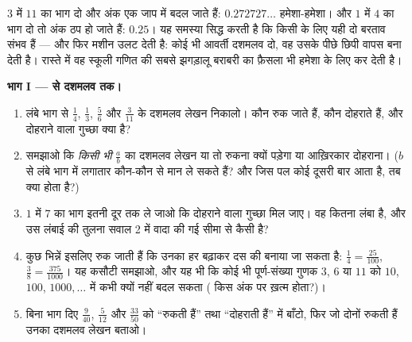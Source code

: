 \begin{problem}
\label{pb:g9:fractions:1}
$3$ में $11$ का भाग दो और अंक एक जाप में बदल जाते हैं:
$0.272727\ldots$ हमेशा-हमेशा। और $1$ में $4$ का भाग दो तो अंक ठप
हो जाते हैं: $0.25$। यह समस्या सिद्ध करती है कि किसी  के लिए
यही दो बरताव संभव हैं --- और फिर मशीन उलट देती है: कोई भी आवर्ती
दशमलव दो, वह उसके पीछे छिपी  वापस बना देती है। रास्ते में वह
स्कूली गणित की सबसे झगड़ालू बराबरी का फ़ैसला भी हमेशा के लिए कर देती
है।

\medskip
\noindent\textbf{भाग I ---  से दशमलव तक।}
\begin{enumerate}
  \item लंबे भाग से $\frac14$, $\frac13$, $\frac56$ और
        $\frac{3}{11}$ के दशमलव लेखन निकालो। कौन रुक जाते हैं,
        कौन दोहराते हैं, और दोहराने वाला गुच्छा क्या है?
  \item समझाओ कि \emph{किसी भी}  $\frac ab$ का दशमलव लेखन या
        तो रुकना क्यों पड़ेगा या आख़िरकार दोहराना। ($b$ से लंबे भाग
        में लगातार  कौन-कौन से मान ले सकते हैं? और जिस पल कोई
         दूसरी बार आता है, तब क्या होता है?)
  \item $1$ में $7$ का भाग इतनी दूर तक ले जाओ कि दोहराने वाला
        गुच्छा मिल जाए। वह कितना लंबा है, और उस लंबाई की तुलना
        सवाल 2 में वादा की गई सीमा से कैसी है?
  \item कुछ भिन्नें इसलिए रुक जाती हैं कि उनका हर बढ़ाकर दस की 
        बनाया जा सकता है: $\frac14 = \frac{25}{100}$,
        $\frac{3}{8} = \frac{375}{1000}$। यह कसौटी समझाओ, और यह भी
        कि कोई भी पूर्ण-संख्या गुणक $3$, $6$ या $11$ को $10$,
        $100$, $1000, \dots$ में कभी क्यों नहीं बदल सकता (
        किस अंक पर ख़त्म होता?)।
  \item बिना भाग दिए $\frac{9}{40}$, $\frac{5}{12}$ और
        $\frac{33}{50}$ को ``रुकती हैं'' तथा ``दोहराती हैं'' में
        बाँटो, फिर जो दोनों रुकती हैं उनका दशमलव लेखन बताओ।
\end{enumerate}


\end{problem}
